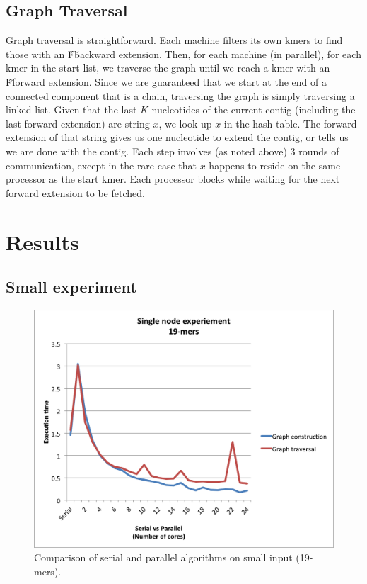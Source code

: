 \documentclass{article}
\begin{document}
\subsection{Graph Traversal}
Graph traversal is straightforward.  Each machine filters its own kmers to find those with an \'F\' backward extension.  Then, for each machine (in parallel), for each kmer in the start list, we traverse the graph until we reach a kmer with an \'F\' forward extension.  Since we are guaranteed that we start at the end of a connected component that is a chain, traversing the graph is simply traversing a linked list.  Given that the last $K$ nucleotides of the current contig (including the last forward extension) are string $x$, we look up $x$ in the hash table.  The forward extension of that string gives us one nucleotide to extend the contig, or tells us we are done with the contig.  Each step involves (as noted above) 3 rounds of communication, except in the rare case that $x$ happens to reside on the same processor as the start kmer.  Each processor blocks while waiting for the next forward extension to be fetched.

\section{Results}
\subsection{Small experiment}

\begin{figure}
  \includegraphics[width=\textwidth]{plots/Result_single_small.png}
  \caption{Comparison of serial and parallel algorithms on small input (19-mers).}
  \label{fig:all}
\end{figure}
\end{document}
